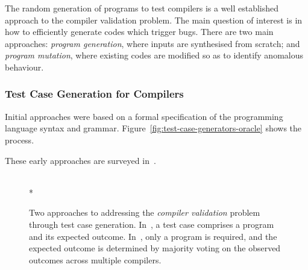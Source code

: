 The random generation of programs to test compilers is a well established approach to the compiler validation problem. The main question of interest is in how to efficiently generate codes which trigger bugs. There are two main approaches: \emph{program generation}, where inputs are synthesised from scratch; and \emph{program mutation}, where existing codes are modified so as to identify anomalous behaviour.


\subsubsection{Test Case Generation for Compilers}

Initial approaches were based on a formal specification of the programming language syntax and grammar. Figure~\ref{fig:test-case-generators-oracle} shows the process.

These early approaches are surveyed in~\cite{Boujarwah1997,Kossatchev2005}.

\begin{figure}
  \centering
  \\*
  \caption[Generating and evaluating compiler test cases]{%
    Two approaches to addressing the \emph{compiler validation} problem through test case generation. In~\protect{}, a test case comprises a program and its expected outcome. In~\protect{}, only a program is required, and the expected outcome is determined by majority voting on the observed outcomes across multiple compilers.%
  }%
  \label{fig:test-case-generators}
\end{figure}

